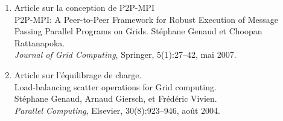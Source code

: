 \documentclass[11pt]{article}
\begin{document}
\begin{enumerate}
\item Article sur la conception de P2P-MPI\\
P2P-MPI: A Peer-to-Peer Framework for Robust Execution of Message Passing Parallel Programs on Grids.
Stéphane Genaud et Choopan Rattanapoka.\\
{\em Journal of Grid Computing}, Springer, 5(1):27--42, mai 2007.\\


\item Article sur l'équilibrage de charge.\\
Load-balancing scatter operations for Grid computing.\\
Stéphane Genaud, Arnaud Giersch, et Frédéric Vivien.\\
{\em Parallel Computing}, Elsevier, 30(8):923--946, août 2004.\\


\end{enumerate}







%
%






\end{document}

